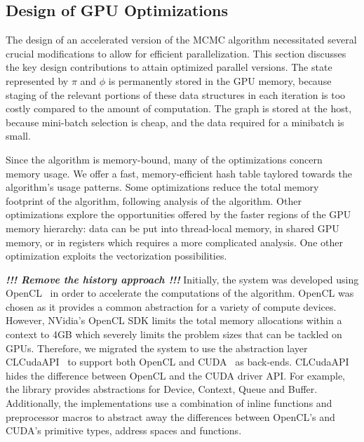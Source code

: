 
\subsection{Design of GPU Optimizations}

The design of an accelerated version of the MCMC algorithm necessitated several
crucial modifications to allow for efficient parallelization. This section
discusses the key design contributions to attain optimized
parallel versions. The state represented by $\pi$ and $\phi$ is permanently
stored in the GPU memory, because staging of the relevant portions of these
data structures in each iteration is too costly compared to the amount
of computation. The graph is stored at the host, because mini-batch
selection is cheap, and the data required for a minibatch is small.

Since the algorithm is memory-bound, many of the optimizations concern
memory usage. We offer a fast, memory-efficient hash table taylored towards
the algorithm's usage patterns. Some optimizations reduce the total memory
footprint of the algorithm, following analysis of the algorithm. Other
optimizations explore the opportunities offered by the faster regions of the
GPU memory hierarchy: data can be put into thread-local memory, in shared
GPU memory, or in registers which requires a more complicated analysis. One
other optimization exploits the vectorization possibilities.

\textit{\bf !!! Remove the history approach !!!}
Initially, the system was developed using OpenCL~\cite{opencl} in order to
accelerate the computations of the algorithm. OpenCL was chosen as it provides
a common abstraction for a variety of compute devices.
However, NVidia's OpenCL SDK limits the
total memory allocations within a context to 4GB which severely limits the
problem sizes that can be tackled on GPUs. Therefore, we migrated the system to
use the abstraction layer CLCudaAPI~\cite{claduc}
to support both OpenCL and CUDA~\cite{Nickolls:2008:SPP:1365490.1365500}
as back-ends.
%
CLCudaAPI
hides the difference between OpenCL and the CUDA driver API.
For example, the library provides abstractions for Device, Context, Queue and
Buffer. Additionally, the implementations use a combination of inline functions
and preprocessor macros to abstract away the differences between OpenCL's and
CUDA's primitive types, address spaces and functions.

